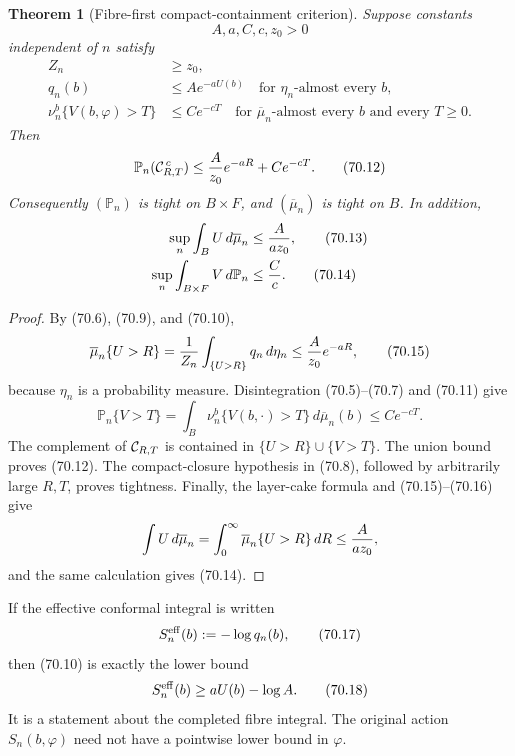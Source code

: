 \documentclass[11pt]{article}
\newtheorem{theorem}{Theorem}[section]
\theoremstyle{remark}
\begin{document}
\begin{theorem}[Fibre-first compact-containment criterion]
\label{thm:v12v70-fibre-first}
Suppose constants
\[
 A,a,C,c,z_0>0
\]
independent of \(n\) satisfy
\begin{align}
 Z_n&\geq z_0,                                                \tag{70.9}\\
 q_n(b)&\leq A e^{-aU(b)}
 \quad\text{for }\eta_n\text{-almost every }b,               \tag{70.10}\\
 \nu_n^b\{V(b,\varphi)>T\}&\leq C e^{-cT}
 \quad\text{for }\overline\mu_n\text{-almost every }b
 \text{ and every }T\geq0.                                  \tag{70.11}
\end{align}
Then
\begin{equation}
 {\mathbb P}_n({\cal C}_{R,T}^{\,c})
 \leq {A\over z_0}e^{-aR}+Ce^{-cT}.                          \tag{70.12}
\end{equation}
Consequently \(({\mathbb P}_n)\) is tight on \(B\times F\), and
\((\overline\mu_n)\) is tight on \(B\).  In addition,
\begin{align}
 \sup_n\int_B U\,d\overline\mu_n
 &\leq {A\over a z_0},                                      \tag{70.13}\\
 \sup_n\int_{B\times F}V\,d{\mathbb P}_n
 &\leq {C\over c}.                                          \tag{70.14}
\end{align}
\end{theorem}

\begin{proof}
By (70.6), (70.9), and (70.10),
\[
 \overline\mu_n\{U>R\}
 ={1\over Z_n}\int_{\{U>R\}}q_n\,d\eta_n
 \leq {A\over z_0}e^{-aR},                                  \tag{70.15}
\]
because \(\eta_n\) is a probability measure.  Disintegration
(70.5)--(70.7) and (70.11) give
\[
 {\mathbb P}_n\{V>T\}
 =\int_B\nu_n^b\{V(b,\cdot)>T\}\,d\overline\mu_n(b)
 \leq Ce^{-cT}.                                              \tag{70.16}
\]
The complement of \({\cal C}_{R,T}\) is contained in
\(\{U>R\}\cup\{V>T\}\).  The union bound proves (70.12).
The compact-closure hypothesis in (70.8), followed by arbitrarily
large \(R,T\), proves tightness.  Finally, the layer-cake formula and
(70.15)--(70.16) give
\[
 \int U\,d\overline\mu_n
 =\int_0^\infty\overline\mu_n\{U>R\}\,dR
 \leq {A\over az_0},
\]
and the same calculation gives (70.14).
\end{proof}

If the effective conformal integral is written
\begin{equation}
                         S_n^{\rm eff}(b):=-\log q_n(b),      \tag{70.17}
\end{equation}
then (70.10) is exactly the lower bound
\begin{equation}
 S_n^{\rm eff}(b)\geq aU(b)-\log A.                          \tag{70.18}
\end{equation}
It is a statement about the completed fibre integral.  The original
action \(S_n(b,\varphi)\) need not have a pointwise lower bound in
\(\varphi\).
\end{document}
